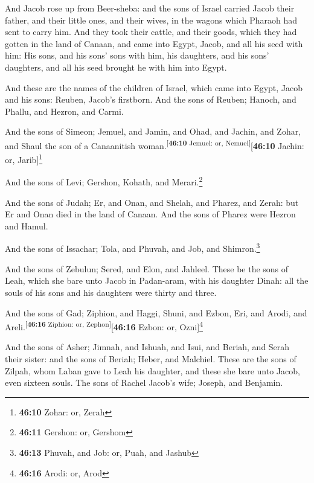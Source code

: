  And Jacob rose up from Beer-sheba: and the sons of Israel
carried Jacob their father, and their little ones, and their wives, in
the wagons which Pharaoh had sent to carry him.  And they
took their cattle, and their goods, which they had gotten in the land of
Canaan, and came into Egypt, Jacob, and all his seed with him:
 His sons, and his sons' sons with him, his daughters, and
his sons' daughters, and all his seed brought he with him into Egypt.

 And these are the names of the children of Israel, which
came into Egypt, Jacob and his sons: Reuben, Jacob's firstborn.
 And the sons of Reuben; Hanoch, and Phallu, and Hezron,
and Carmi.

 And the sons of Simeon; Jemuel, and Jamin, and Ohad, and
Jachin, and Zohar, and Shaul the son of a Canaanitish
woman.\textsuperscript{{[}\textbf{46:10} Jemuel: or,
Nemuel{]}}{[}\textbf{46:10} Jachin: or, Jarib{]}\footnote{\textbf{46:10}
  Zohar: or, Zerah}

 And the sons of Levi; Gershon, Kohath, and
Merari.\footnote{\textbf{46:11} Gershon: or, Gershom}

 And the sons of Judah; Er, and Onan, and Shelah, and
Pharez, and Zerah: but Er and Onan died in the land of Canaan. And the
sons of Pharez were Hezron and Hamul.

 And the sons of Issachar; Tola, and Phuvah, and Job, and
Shimron.\footnote{\textbf{46:13} Phuvah, and Job: or, Puah, and Jashub}

 And the sons of Zebulun; Sered, and Elon, and Jahleel.
 These be the sons of Leah, which she bare unto Jacob in
Padan-aram, with his daughter Dinah: all the souls of his sons and his
daughters were thirty and three.

 And the sons of Gad; Ziphion, and Haggi, Shuni, and
Ezbon, Eri, and Arodi, and Areli.\textsuperscript{{[}\textbf{46:16}
Ziphion: or, Zephon{]}}{[}\textbf{46:16} Ezbon: or, Ozni{]}\footnote{\textbf{46:16}
  Arodi: or, Arod}

 And the sons of Asher; Jimnah, and Ishuah, and Isui, and
Beriah, and Serah their sister: and the sons of Beriah; Heber, and
Malchiel.  These are the sons of Zilpah, whom Laban gave
to Leah his daughter, and these she bare unto Jacob, even sixteen souls.
 The sons of Rachel Jacob's wife; Joseph, and Benjamin.

